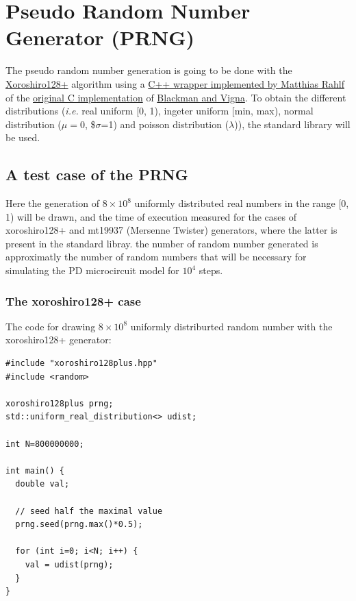 \documentclass[11pt]{scrartcl}
\begin{document}
\section{Pseudo Random Number Generator (PRNG)}
\label{sec:org78260f4}

The pseudo random number generation is going to be done with the \href{https://en.wikipedia.org/wiki/Xoroshiro128\%2B}{Xoroshiro128+} algorithm using a \href{https://gist.github.com/siebenschlaefer/bfe750df9b7104ba4eed874223b8ab1f}{C++ wrapper implemented by Matthias Rahlf} of the \href{http://vigna.di.unimi.it/xorshift/xoroshiro128plus.c}{original C implementation} of \href{https://arxiv.org/abs/1805.01407}{Blackman and Vigna}. 
To obtain the different distributions (\emph{i.e.} real uniform [0, 1), ingeter uniform [min, max), normal distribution (\(\mu=0\), \$\(\sigma\)=1) and poisson distribution (\(\lambda\))), the standard library will be used.

\subsection{A test case of the PRNG}
\label{sec:org708cd29}

Here the generation of \(8\times 10^8\) uniformly distributed real numbers in the range [0, 1) will be drawn, and the time of execution measured for the cases of xoroshiro128+ and mt19937 (Mersenne Twister) generators, where the latter is present in the standard libray. the number of random number generated is approximatly the number of random numbers that will be necessary for simulating the PD microcircuit model for \(10^4\) steps.

\subsubsection{The xoroshiro128+ case}
\label{sec:org9dc6d38}

The code for drawing \(8\times 10^8\) uniformly distriburted random number with the xoroshiro128+ generator:

\begin{verbatim}
#include "xoroshiro128plus.hpp"
#include <random>

xoroshiro128plus prng;
std::uniform_real_distribution<> udist;

int N=800000000;

int main() {
  double val;

  // seed half the maximal value
  prng.seed(prng.max()*0.5);

  for (int i=0; i<N; i++) {
    val = udist(prng);
  }
}
\end{verbatim}
\end{document}
